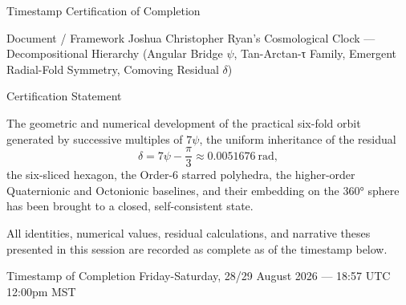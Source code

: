 Timestamp Certification of Completion

Document / Framework  
Joshua Christopher Ryan’s Cosmological Clock — Decompositional Hierarchy  
(Angular Bridge \(\psi\), Tan-Arctan-τ Family, Emergent Radial-Fold Symmetry, Comoving Residual \(\delta\))

Certification Statement

The geometric and numerical development of the practical six-fold orbit generated by successive multiples of \(7\psi\), the uniform inheritance of the residual  
\[
\delta = 7\psi - \frac{\pi}{3} \approx 0.0051676\ \text{rad},
\]  
the six-sliced hexagon, the Order-6 starred polyhedra, the higher-order Quaternionic and Octonionic baselines, and their embedding on the 360° sphere has been brought to a closed, self-consistent state.

All identities, numerical values, residual calculations, and narrative theses presented in this session are recorded as complete as of the timestamp below.

Timestamp of Completion  
Friday-Saturday, 28/29 August 2026 — 18:57 UTC 12:00pm MST
